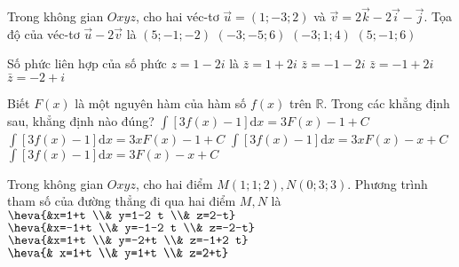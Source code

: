 \begin{ex}%
	Trong không gian $Oxyz$, cho hai véc-tơ $\vec{u}=(1 ;-3 ; 2)$ và $\vec{v}=2 \vec{k}-2 \vec{i}-\vec{j}$. Tọa độ của véc-tơ $\vec{u}-2\vec{v}$ là
	\choice
	{\True $(5 ;-1 ;-2)$}
	{ $(-3 ;-5 ; 6)$}
	{ $(-3 ; 1 ; 4)$}
	{ $(5 ;-1 ; 6)$}
\end{ex}

\begin{ex}%
	Số phức liên hợp của số phức $z=1-2i$ là
	\choice
	{\True $\bar{z}=1+2 i$}
	{ $\bar{z}=-1-2 i$}
	{ $\bar{z}=-1+2 i$}
	{ $\bar{z}=-2+i$}
\end{ex}

\begin{ex}%
	Biết $F(x)$ là một nguyên hàm của hàm số $f(x)$ trên $\mathbb{R}$. Trong các khẳng định sau, khẳng định nào đúng?
	\choice
	{ $\displaystyle\int\limits[3f(x)-1] \mathrm{d}x=3F(x)-1+C$}
	{ $\displaystyle\int\limits[3f(x)-1] \mathrm{d}x=3xF(x)-1+C$}
	{ $\displaystyle\int\limits[3f(x)-1] \mathrm{d}x=3xF(x)-x+C$}
	{ \True$\displaystyle\int\limits[3f(x)-1] \mathrm{d}x=3F(x)-x+C$}
\end{ex}

\begin{ex}%
	Trong không gian $O x y z$, cho hai điểm $M(1;1;2), N(0;3;3)$. Phương trình tham số của đường thẳng đi qua hai điểm $M, N$ là
	\choice
	{\True $\heva{&x=1+t \\& y=1-2 t \\& z=2-t}$}
	{$\heva{&x=-1+t \\& y=-1-2 t \\& z=-2-t}$}
	{ $\heva{&x=1+t \\& y=-2+t \\& z=-1+2 t}$}
	{ $ \heva{& x=1+t \\& y=1+t \\& z=2+t}$}
\end{ex}

